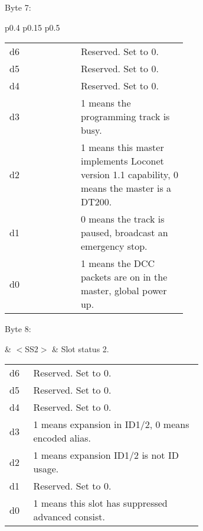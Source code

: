 Byte 7:

\begin{tabular}{p{0.4\linewidth} p{0.15\linewidth} p{0.5\linewidth}} 

\begin{tabular}{|p{0.3cm}|p{0.3cm}|p{0.3cm}|p{0.3cm}|p{0.3cm}|p{0.3cm}|p{0.3cm}|p{0.3cm}|}
\hline
0 & d6 & d5 & d4 & d3 & d2 & d1 & d0\\
\hline
\end{tabular}
& $<$TRK$>$ & Global system track status.\\
\end{tabular}

\begin{tabular}{p{0.05\linewidth} p{0.6\linewidth}} 
d6 & Reserved. Set to 0.\\
d5 & Reserved. Set to 0.\\
d4 & Reserved. Set to 0.\\
d3 & 1 means the programming track is busy.\\
d2 & 1 means this master implements Loconet version 1.1 capability,  0 means the master is a DT200.\\
d1 & 0 means the track is paused, broadcast an emergency stop.\\
d0 & 1 means the DCC packets are on in the master, global power up.\\
\end{tabular}

Byte 8:

& $<$SS2$>$ & Slot status 2.\\
\end{tabular}

\begin{tabular}{p{0.05\linewidth} p{0.6\linewidth}} 
d6 & Reserved. Set to 0.\\
d5 & Reserved. Set to 0.\\
d4 & Reserved. Set to 0.\\
d3 & 1 means expansion in ID1/2, 0 means encoded alias.\\
d2 & 1 means expansion ID1/2 is not ID usage.\\
d1 & Reserved. Set to 0.\\
d0 & 1 means this slot has suppressed advanced consist.\\
\end{tabular}

